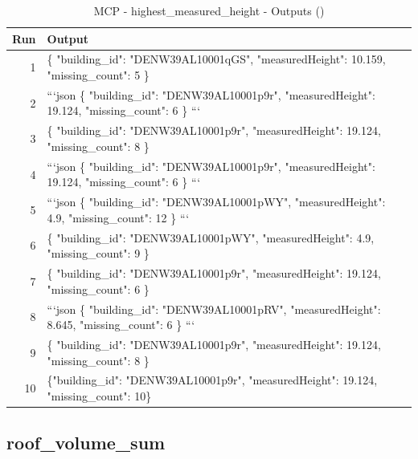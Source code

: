 \documentclass[a4paper,11pt]{article}
\begin{document}
\begin{table}[ht]
\centering
\scriptsize
\caption{MCP - highest\_measured\_height - Outputs ()}
\label{tab:mcp\_highest\_measured\_height\_outputs\_}
\begin{tabular}{r p{12cm}}
\hline
Run & Output \\
\hline
1 & \{
  "building\_id": "DENW39AL10001qGS",
  "measuredHeight": 10.159,
  "missing\_count": 5
\} \\
2 & ```json
\{
  "building\_id": "DENW39AL10001p9r",
  "measuredHeight": 19.124,
  "missing\_count": 6
\}
``` \\
3 & \{
  "building\_id": "DENW39AL10001p9r",
  "measuredHeight": 19.124,
  "missing\_count": 8
\} \\
4 & ```json
\{
  "building\_id": "DENW39AL10001p9r",
  "measuredHeight": 19.124,
  "missing\_count": 6
\}
``` \\
5 & ```json
\{
  "building\_id": "DENW39AL10001pWY",
  "measuredHeight": 4.9,
  "missing\_count": 12
\}
``` \\
6 & \{
  "building\_id": "DENW39AL10001pWY",
  "measuredHeight": 4.9,
  "missing\_count": 9
\} \\
7 & \{
  "building\_id": "DENW39AL10001p9r",
  "measuredHeight": 19.124,
  "missing\_count": 6
\} \\
8 & ```json
\{
  "building\_id": "DENW39AL10001pRV",
  "measuredHeight": 8.645,
  "missing\_count": 6
\}
``` \\
9 & \{
  "building\_id": "DENW39AL10001p9r",
  "measuredHeight": 19.124,
  "missing\_count": 8
\} \\
10 & \{"building\_id": "DENW39AL10001p9r", "measuredHeight": 19.124, "missing\_count": 10\} \\
\hline
\end{tabular}
\end{table}

\clearpage
\subsection{roof\_volume\_sum}
\end{document}
